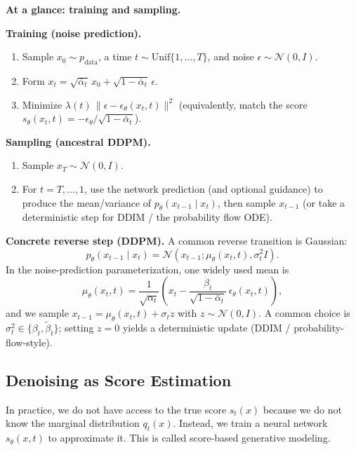 \vspSection

\begin{pausebox}
\textbf{At a glance: training and sampling.}

\textbf{Training (noise prediction).}
\begin{enumerate}
\item Sample $x_0\sim p_{\text{data}}$, a time $t\sim\mathrm{Unif}\{1,\dots,T\}$, and noise $\epsilon\sim\mathcal{N}(0,I)$.
\item Form $x_t=\sqrt{\bar{\alpha}_t}\,x_0+\sqrt{1-\bar{\alpha}_t}\,\epsilon$.
\item Minimize $\lambda(t)\,\|\epsilon-\epsilon_\theta(x_t,t)\|^2$ (equivalently, match the score $s_\theta(x_t,t)=-\epsilon_\theta/\sqrt{1-\bar{\alpha}_t}$).
\end{enumerate}

\textbf{Sampling (ancestral DDPM).}
\begin{enumerate}
\item Sample $x_T\sim\mathcal{N}(0,I)$.
\item For $t=T,\dots,1$, use the network prediction (and optional guidance) to produce the mean/variance of $p_\theta(x_{t-1}\mid x_t)$, then sample $x_{t-1}$ (or take a deterministic step for DDIM / the probability flow ODE).
\end{enumerate}
\end{pausebox}

\vspSection

\vspPara
\textbf{Concrete reverse step (DDPM).} A common reverse transition is Gaussian:
$$p_\theta(x_{t-1}\mid x_t)=\mathcal{N}\!\left(x_{t-1};\mu_\theta(x_t,t),\sigma_t^2 I\right).$$
In the noise-prediction parameterization, one widely used mean is
$$\mu_\theta(x_t,t)=\frac{1}{\sqrt{\alpha_t}}\left(x_t-\frac{\beta_t}{\sqrt{1-\bar{\alpha}_t}}\,\epsilon_\theta(x_t,t)\right),$$
and we sample $x_{t-1}=\mu_\theta(x_t,t)+\sigma_t z$ with $z\sim\mathcal{N}(0,I)$. A common choice is $\sigma_t^2\in\{\beta_t,\tilde{\beta}_t\}$; setting $z=0$ yields a deterministic update (DDIM / probability-flow-style).

\subsection{Denoising as Score Estimation}

In practice, we do not have access to the true score $s_t(x)$ because we do not know the marginal distribution $q_t(x)$. Instead, we train a neural network $s_\theta(x,t)$ to approximate it. This is called score-based generative modeling.

